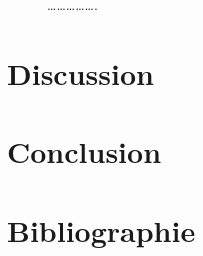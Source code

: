 \documentclass[
  oneside,
  open=any]{scrreprt}
\begin{document}
\begin{figure}[H]


\caption{\label{fig-waterfall-0}\ldots\ldots\ldots\ldots\ldots.}

\end{figure}%

\chapter{Discussion}\label{sec-discussion}

\chapter{Conclusion}\label{sec-conclusion}

\chapter{Bibliographie}\label{sec-bib}
\end{document}
